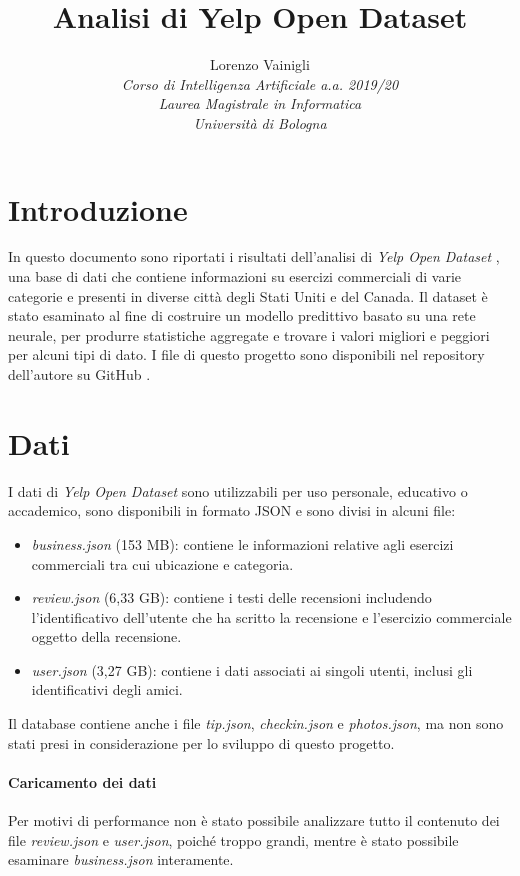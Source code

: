 \documentclass[12pt]{article}
\title{Analisi di Yelp Open Dataset}
\author{
        Lorenzo Vainigli\\
        \textit{\small Corso di Intelligenza Artificiale a.a. 2019/20}\\
        \textit{\small Laurea Magistrale in Informatica}\\
        \textit{\small Università di Bologna}
}
\date{}
\begin{document}
\maketitle
\tableofcontents

\section{Introduzione}
In questo documento sono riportati i risultati dell'analisi di \textit{Yelp Open Dataset} \cite{yelp}, una base di dati che contiene informazioni su esercizi commerciali di varie categorie e presenti in diverse città degli Stati Uniti e del Canada.\newline
Il dataset è stato esaminato al fine di costruire un modello predittivo basato su una rete neurale, per produrre statistiche aggregate e trovare i valori migliori e peggiori per alcuni tipi di dato. \newline
I file di questo progetto sono disponibili nel repository dell'autore su GitHub \cite{repo}. 

\section{Dati}
I dati di \textit{Yelp Open Dataset} sono utilizzabili per uso personale, educativo o accademico, sono disponibili in formato JSON e sono divisi in alcuni file:
\begin{itemize}
\item \textit{business.json} (153 MB): contiene le informazioni relative agli esercizi commerciali tra cui ubicazione e categoria.
\item \textit{review.json} (6,33 GB): contiene i testi delle recensioni includendo l'identificativo dell'utente che ha scritto la recensione e l'esercizio commerciale oggetto della recensione.
\item \textit{user.json} (3,27 GB): contiene i dati associati ai singoli utenti, inclusi gli identificativi degli amici.
\end{itemize}
Il database contiene anche i file \textit{tip.json}, \textit{checkin.json} e \textit{photos.json}, ma non sono stati presi in considerazione per lo sviluppo di questo progetto.
\paragraph{Caricamento dei dati}
Per motivi di performance non è stato possibile analizzare tutto il contenuto dei file \textit{review.json} e \textit{user.json}, poiché troppo grandi, mentre è stato possibile esaminare \textit{business.json} interamente.
\end{document}
